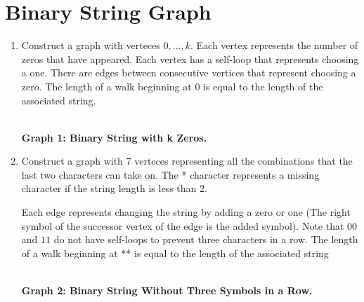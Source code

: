 \documentclass{article}
\begin{document}
\section{Binary String Graph}
   \begin{enumerate}
      \item Construct a graph with verteces $0,\hdots,k$.
         Each vertex represents the number of zeros that have appeared.
         Each vertex has a self-loop that represents choosing a one.
         There are edges between consecutive vertices that represent choosing a zero.
         The length of a walk beginning at 0 
         is equal to the length of the associated string.

         \\
         \textbf{Graph 1: Binary String with k Zeros.}
      \item Construct a graph with 7 verteces representing all the combinations 
         that the last two characters can take on. 
         The * character represents a missing character 
         if the string length is less than 2.

         Each edge represents changing the string by adding a zero or one
         (The right symbol of the successor vertex of the edge is the added symbol).
         Note that $00$ and $11$ do not have self-loops 
         to prevent three characters in a row.
         The length of a walk beginning at ** 
         is equal to the length of the associated string

         \\
         \textbf{Graph 2: Binary String Without Three Symbols in a Row.}
   \end{enumerate}
   \newpage 
\end{document}
